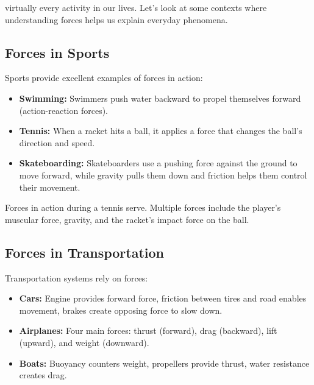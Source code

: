 \documentclass[justified,notoc]{tufte-book}
\begin{document}
 virtually every activity in our lives. Let's look at some contexts where understanding forces helps us explain everyday phenomena.

\subsection{Forces in Sports}

Sports provide excellent examples of forces in action:

\begin{itemize}
    \item \textbf{Swimming:} Swimmers push water backward to propel themselves forward (action-reaction forces).

    \item \textbf{Tennis:} When a racket hits a ball, it applies a force that changes the ball's direction and speed.

    \item \textbf{Skateboarding:} Skateboarders use a pushing force against the ground to move forward, while gravity pulls them down and friction helps them control their movement.
\end{itemize}

\begin{marginfigure}
    \centering
    \fbox{\rule{0pt}{4cm}\rule{6cm}{0pt}}
    \caption{Forces in action during a tennis serve. Multiple forces include the player's muscular force, gravity, and the racket's impact force on the ball.}
\end{marginfigure}

\subsection{Forces in Transportation}

Transportation systems rely on forces:

\begin{itemize}
    \item \textbf{Cars:} Engine provides forward force, friction between tires and road enables movement, brakes create opposing force to slow down.

    \item \textbf{Airplanes:} Four main forces: thrust (forward), drag (backward), lift (upward), and weight (downward).

    \item \textbf{Boats:} Buoyancy counters weight, propellers provide thrust, water resistance creates drag.
\end{itemize}
\end{document}
